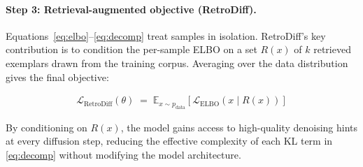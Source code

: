 \documentclass[11pt]{article}
\begin{document}
\paragraph{Step 3: Retrieval-augmented objective (RetroDiff).}
Equations~\eqref{eq:elbo}--\eqref{eq:decomp} treat samples in isolation.
RetroDiff's key contribution is to condition the per-sample ELBO on a set
$R(x)$ of $k$ retrieved exemplars drawn from the training corpus.  Averaging over
the data distribution gives the final objective:

\begin{align}
  \mathcal{L}_{\mathrm{RetroDiff}}(\theta)
  \;=\;
  \mathbb{E}_{x\sim p_{\mathrm{data}}}\!\left[
    \mathcal{L}_{\mathrm{ELBO}}\!\left(x\;\big|\;R(x)\right)
  \right]
  \label{eq:retro}
\end{align}

By conditioning on $R(x)$, the model gains access to high-quality denoising hints at
every diffusion step, reducing the effective complexity of each KL term in
\eqref{eq:decomp} without modifying the model architecture.
\end{document}
